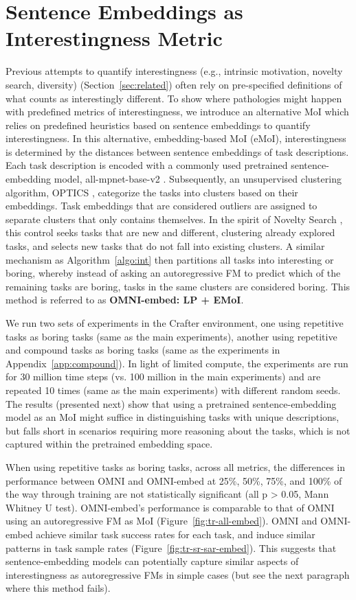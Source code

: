 \documentclass{article} %
\begin{document}
\section{Sentence Embeddings as Interestingness Metric}
Previous attempts to quantify interestingness (e.g., intrinsic motivation, novelty search, diversity) (Section~\ref{sec:related}) often rely on pre-specified definitions of what counts as interestingly different. To show where pathologies might happen with predefined metrics of interestingness, we introduce an alternative MoI which relies on predefined heuristics based on sentence embeddings to quantify interestingness. In this alternative, embedding-based MoI (eMoI), interestingness is determined by the distances between sentence embeddings of task descriptions. Each task description is encoded with a commonly used pretrained sentence-embedding model, all-mpnet-base-v2 \citep{reimers2019sentence}. Subsequently, an unsupervised clustering algorithm, OPTICS \citep{ankerst1999optics}, categorize the tasks into clusters based on their embeddings. Task embeddings that are considered outliers are assigned to separate clusters that only contains themselves. In the spirit of Novelty Search \citep{lehman2011novelty}, this control seeks tasks that are new and different, clustering already explored tasks, and selects new tasks that do not fall into existing clusters. A similar mechanism as Algorithm~\ref{algo:int} then partitions all tasks into interesting or boring, whereby instead of asking an autoregressive FM to predict which of the remaining tasks are boring, tasks in the same clusters are considered boring. This method is referred to as \textbf{OMNI-embed: LP + EMoI}.

We run two sets of experiments in the Crafter environment, one using repetitive tasks as boring tasks (same as the main experiments), another using repetitive and compound tasks as boring tasks (same as the experiments in Appendix~\ref{app:compound}). In light of limited compute, the experiments are run for 30 million time steps (vs. 100 million in the main experiments) and are repeated 10 times (same as the main experiments) with different random seeds. The results (presented next) show that using a pretrained sentence-embedding model as an MoI might suffice in distinguishing tasks with unique descriptions, but falls short in scenarios requiring more reasoning about the tasks, which is not captured within the pretrained embedding space.

When using repetitive tasks as boring tasks, across all metrics, the differences in performance between OMNI and OMNI-embed at 25\%, 50\%, 75\%, and 100\% of the way through training are not statistically significant (all p > 0.05, Mann Whitney U test). OMNI-embed's performance is comparable to that of OMNI using an autoregressive FM as MoI (Figure~\ref{fig:tr-all-embed}). OMNI and OMNI-embed achieve similar task success rates for each task, and induce similar patterns in task sample rates (Figure~\ref{fig:tr-sr-sar-embed}). This suggests that sentence-embedding models can potentially capture similar aspects of interestingness as autoregressive FMs in simple cases (but see the next paragraph where this method fails).
\end{document}
